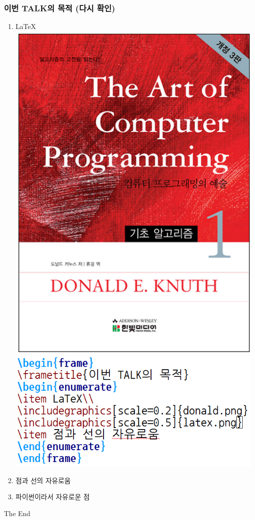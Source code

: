 \documentclass{beamer}
\newcommand{\fbckg}[1]{\usebackgroundtemplate{\texttt{[image: \#1]}}}%
\begin{document}
\begin{frame}
\frametitle{이번 TALK의 목적 (다시 확인)}
\begin{enumerate}
\item LaTeX\\
\includegraphics[scale=0.2]{donald.png}
\quad
\includegraphics[scale=0.5]{latex.png}\\
\item 점과 선의 자유로움\\
\item 파이썬이라서 자유로운 점
\end{enumerate}
\end{frame}

{\fbckg{unist_scape.jpg}
\begin{frame}
\Huge{\centerline{The End}}
\end{frame}
}
\end{document}

